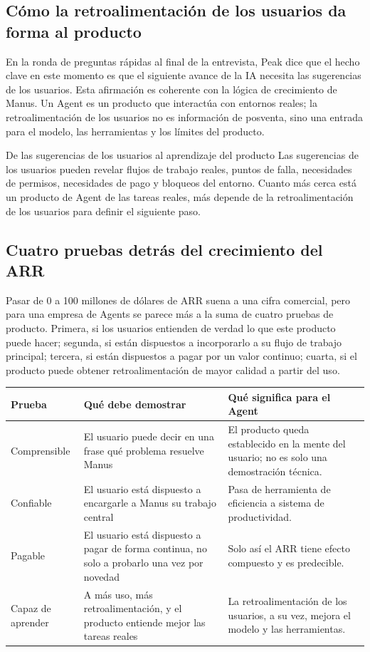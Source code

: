 \subsection{Cómo la retroalimentación de los usuarios da forma al producto}

En la ronda de preguntas rápidas al final de la entrevista, Peak dice que el hecho clave en este momento es que el siguiente avance de la IA necesita las sugerencias de los usuarios. Esta afirmación es coherente con la lógica de crecimiento de Manus. Un Agent es un producto que interactúa con entornos reales; la retroalimentación de los usuarios no es información de posventa, sino una entrada para el modelo, las herramientas y los límites del producto.

\begin{knowledgebox}{De las sugerencias de los usuarios al aprendizaje del producto}
Las sugerencias de los usuarios pueden revelar flujos de trabajo reales, puntos de falla, necesidades de permisos, necesidades de pago y bloqueos del entorno. Cuanto más cerca está un producto de Agent de las tareas reales, más depende de la retroalimentación de los usuarios para definir el siguiente paso.
\end{knowledgebox}

\subsection{Cuatro pruebas detrás del crecimiento del ARR}

Pasar de 0 a 100 millones de dólares de ARR suena a una cifra comercial, pero para una empresa de Agents se parece más a la suma de cuatro pruebas de producto. Primera, si los usuarios entienden de verdad lo que este producto puede hacer; segunda, si están dispuestos a incorporarlo a su flujo de trabajo principal; tercera, si están dispuestos a pagar por un valor continuo; cuarta, si el producto puede obtener retroalimentación de mayor calidad a partir del uso.

\begin{longtable}{p{}p{}p{}}
\toprule
Prueba & Qué debe demostrar & Qué significa para el Agent \\
\midrule
Comprensible & El usuario puede decir en una frase qué problema resuelve Manus & El producto queda establecido en la mente del usuario; no es solo una demostración técnica. \\
Confiable & El usuario está dispuesto a encargarle a Manus su trabajo central & Pasa de herramienta de eficiencia a sistema de productividad. \\
Pagable & El usuario está dispuesto a pagar de forma continua, no solo a probarlo una vez por novedad & Solo así el ARR tiene efecto compuesto y es predecible. \\
Capaz de aprender & A más uso, más retroalimentación, y el producto entiende mejor las tareas reales & La retroalimentación de los usuarios, a su vez, mejora el modelo y las herramientas. \\
\bottomrule
\end{longtable}

